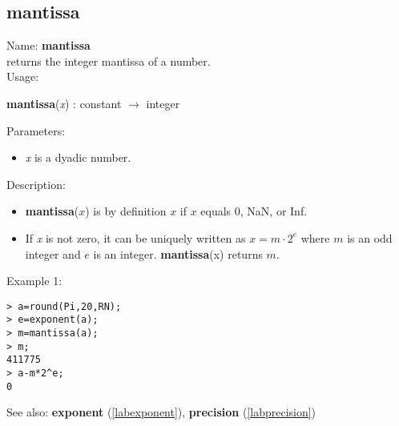 \subsection{mantissa}
\label{labmantissa}
\noindent Name: \textbf{mantissa}\\
returns the integer mantissa of a number.\\
\noindent Usage: 
\begin{center}
\textbf{mantissa}(\emph{x}) : \textsf{constant} $\rightarrow$ \textsf{integer}
\\ 
\end{center}
Parameters: 
\begin{itemize}
\item \emph{x} is a dyadic number.
\end{itemize}
\noindent Description: \begin{itemize}

\item \textbf{mantissa}($x$) is by definition $x$ if $x$ equals 0, NaN, or Inf.

\item If \emph{x} is not zero, it can be uniquely written as $x = m \cdot 2^e$ where
   $m$ is an odd integer and $e$ is an integer. \textbf{mantissa}(x) returns $m$. 
\end{itemize}
\noindent Example 1: 
\begin{center}\begin{minipage}{15cm}\begin{Verbatim}[frame=single]
> a=round(Pi,20,RN);
> e=exponent(a);
> m=mantissa(a);
> m;
411775
> a-m*2^e;
0
\end{Verbatim}
\end{minipage}\end{center}
See also: \textbf{exponent} (\ref{labexponent}), \textbf{precision} (\ref{labprecision})
